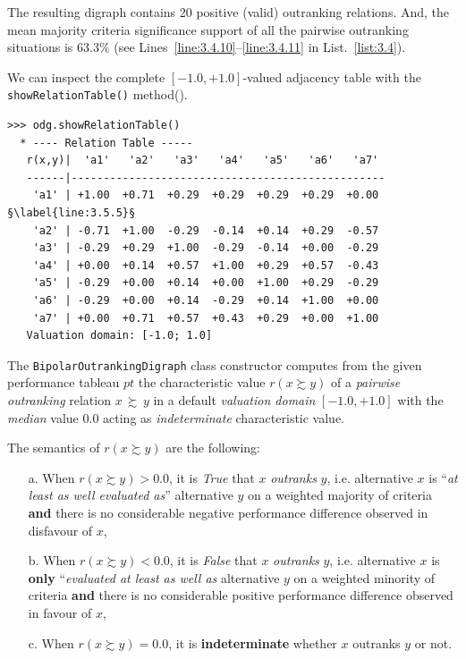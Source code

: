 The resulting digraph contains 20 positive (valid) outranking relations. And, the mean majority criteria significance support of all the pairwise outranking situations is $63.3\%$ (see Lines~\ref{line:3.4.10}--\ref{line:3.4.11} in List.~\vref{list:3.4}).

We can inspect the complete $[-1.0,+1.0]$-valued adjacency table with the \texttt{show\-RelationTable()} method().
\begin{lstlisting}[caption={Inspecting the valued adjacency table.},label=list:3.5]
>>> odg.showRelationTable()
  * ---- Relation Table -----
   r(x,y)|  'a1'   'a2'   'a3'   'a4'   'a5'   'a6'   'a7'   
   ------|-------------------------------------------------
    'a1' | +1.00  +0.71  +0.29  +0.29  +0.29  +0.29  +0.00  §\label{line:3.5.5}§
    'a2' | -0.71  +1.00  -0.29  -0.14  +0.14  +0.29  -0.57  
    'a3' | -0.29  +0.29  +1.00  -0.29  -0.14  +0.00  -0.29  
    'a4' | +0.00  +0.14  +0.57  +1.00  +0.29  +0.57  -0.43  
    'a5' | -0.29  +0.00  +0.14  +0.00  +1.00  +0.29  -0.29  
    'a6' | -0.29  +0.00  +0.14  -0.29  +0.14  +1.00  +0.00  
    'a7' | +0.00  +0.71  +0.57  +0.43  +0.29  +0.00  +1.00  
   Valuation domain: [-1.0; 1.0]
\end{lstlisting}

The \texttt{BipolarOutrankingDigraph} class constructor computes from the given performance tableau $pt$ the characteristic value $r(x \succsim y)$ of a \emph{pairwise outranking} relation $x\, \succsim \,y$ in a default \emph{valuation domain} $[-1.0,+1.0]$ with the {\em median\/} value $0.0$ acting as \emph{indeterminate} characteristic value. 

The semantics of $r(x \succsim y)$ are the following:
\begin{definition}\label{def:3.1} 
\begin{itemize}[topsep=3pt]
\item [a.] When $r(x \succsim y) > 0.0$, it is \emph{True} that $x$ \emph{outranks} $y$, i.e. alternative $x$ is ``\emph{at least as well evaluated as}'' alternative $y$ on a weighted majority of criteria \textbf{and} there is no considerable negative performance difference observed in disfavour of $x$,
\item [b.] When $r(x \succsim y) < 0.0$, it is \emph{False} that $x$ \emph{outranks} $y$, i.e. alternative $x$ is {\bf only} ``\emph{evaluated at least as well as} alternative $y$ on a weighted minority of criteria \textbf{and} there is no considerable positive performance difference observed in favour of $x$,
\item [c.] When $r(x \succsim y) = 0.0$, it is {\bf indeterminate} whether $x$ outranks $y$ or not.
\end{itemize}
\end{definition}

